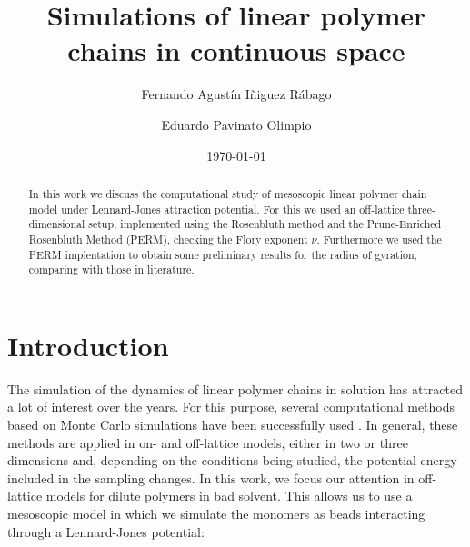 \documentclass[aps,prl,reprint,groupedaddress]{revtex4-1}
\begin{document}
\title{Simulations of linear polymer chains in continuous space}

\author{Fernando Agust\'in I\~niguez R\'abago}
\author{Eduardo Pavinato Olimpio}


\date{\today}

\begin{abstract}
	In this work we discuss the computational study of mesoscopic linear polymer chain model under Lennard-Jones attraction potential. For this we used an off-lattice three-dimensional setup, implemented using the Rosenbluth method and the Prune-Enriched Rosenbluth Method (PERM), checking the Flory exponent $\nu$. Furthermore we used the PERM implentation to obtain some preliminary results for the radius of gyration, comparing with those in literature.
\end{abstract}

\maketitle

\section{Introduction}
The simulation of the dynamics of linear polymer chains in solution has attracted a lot of interest over the years. For this purpose, several computational methods based on Monte Carlo simulations have been successfully used \cite{mc_polymer_review}. In general, these methods are applied in on- and off-lattice models, either in two or three dimensions and, depending on the conditions being studied, the potential energy included in the sampling changes. In this work, we focus our attention in off-lattice models for dilute polymers in bad solvent. This allows us to use a mesoscopic model in which we simulate the monomers as beads interacting through a Lennard-Jones potential:
\end{document}
